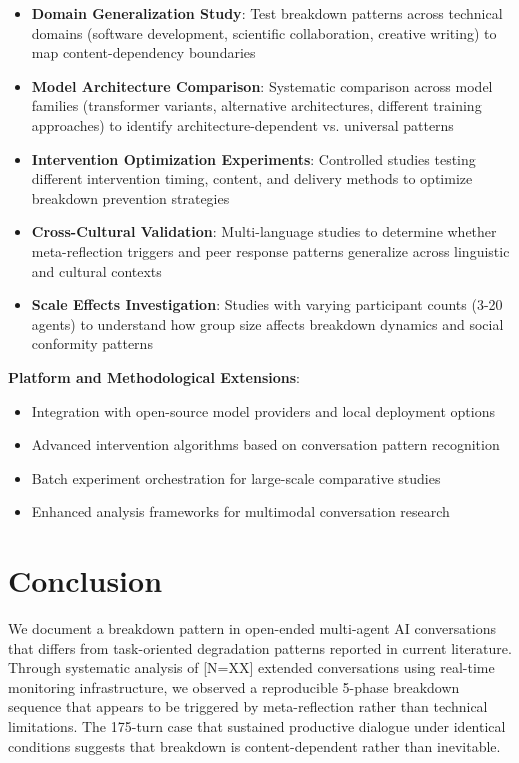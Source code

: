 \documentclass[11pt,letterpaper]{article}
\newcommand{\totalSessions}{[N=XX]} %
\newcommand{\negativeCase}{175} %
\begin{document}
\begin{itemize}
    \item \textbf{Domain Generalization Study}: Test breakdown patterns across technical domains (software development, scientific collaboration, creative writing) to map content-dependency boundaries
    \item \textbf{Model Architecture Comparison}: Systematic comparison across model families (transformer variants, alternative architectures, different training approaches) to identify architecture-dependent vs. universal patterns
    \item \textbf{Intervention Optimization Experiments}: Controlled studies testing different intervention timing, content, and delivery methods to optimize breakdown prevention strategies
    \item \textbf{Cross-Cultural Validation}: Multi-language studies to determine whether meta-reflection triggers and peer response patterns generalize across linguistic and cultural contexts
    \item \textbf{Scale Effects Investigation}: Studies with varying participant counts (3-20 agents) to understand how group size affects breakdown dynamics and social conformity patterns
\end{itemize}

\textbf{Platform and Methodological Extensions}:

\begin{itemize}
    \item Integration with open-source model providers and local deployment options
    \item Advanced intervention algorithms based on conversation pattern recognition  
    \item Batch experiment orchestration for large-scale comparative studies
    \item Enhanced analysis frameworks for multimodal conversation research
\end{itemize}

\section{Conclusion}

We document a breakdown pattern in open-ended multi-agent AI conversations that differs from task-oriented degradation patterns reported in current literature. Through systematic analysis of \totalSessions{} extended conversations using real-time monitoring infrastructure, we observed a reproducible 5-phase breakdown sequence that appears to be triggered by meta-reflection rather than technical limitations. The \negativeCase{}-turn case that sustained productive dialogue under identical conditions suggests that breakdown is content-dependent rather than inevitable.
\end{document}
